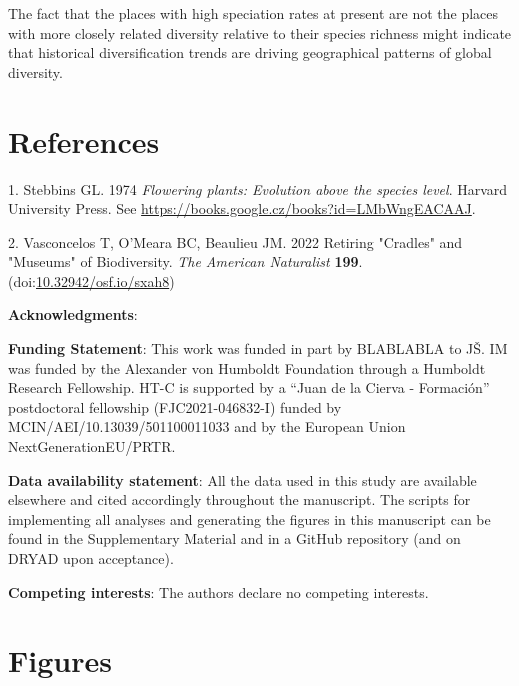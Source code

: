 \documentclass[
  11pt,
]{article}
\begin{document}
The fact that the places with high speciation rates at present are not
the places with more closely related diversity relative to their species
richness might indicate that historical diversification trends are
driving geographical patterns of global diversity.

\newpage

\hypertarget{references}{%
\section*{References}\label{references}}

\setlength{\parindent}{-0.25in} \setlength{\leftskip}{0.25in}
\setlength{\parskip}{8pt} \noindent

\hypertarget{refs}{}
\leavevmode\hypertarget{ref-Stebbins1974}{}%
1. Stebbins GL. 1974 \emph{Flowering plants: Evolution above the species
level}. Harvard University Press. See
\url{https://books.google.cz/books?id=LMbWngEACAAJ}.

\leavevmode\hypertarget{ref-Vasconcelos2022}{}%
2. Vasconcelos T, O'Meara BC, Beaulieu JM. 2022 Retiring "Cradles" and
"Museums" of Biodiversity. \emph{The American Naturalist} \textbf{199}.
(doi:\href{https://doi.org/10.32942/osf.io/sxah8}{10.32942/osf.io/sxah8})

\newpage

\hfill\break

\textbf{Acknowledgments}:

\textbf{Funding Statement}: This work was funded in part by BLABLABLA to
JŠ. IM was funded by the Alexander von Humboldt Foundation through a
Humboldt Research Fellowship. HT-C is supported by a ``Juan de la Cierva
- Formación'' postdoctoral fellowship (FJC2021-046832-I) funded by
MCIN/AEI/10.13039/501100011033 and by the European Union
NextGenerationEU/PRTR.

\textbf{Data availability statement}: All the data used in this study
are available elsewhere and cited accordingly throughout the manuscript.
The scripts for implementing all analyses and generating the figures in
this manuscript can be found in the Supplementary Material and in a
GitHub repository (and on DRYAD upon acceptance).

\textbf{Competing interests}: The authors declare no competing
interests.

\newpage

\hypertarget{figures}{%
\section{Figures}\label{figures}}
\end{document}
